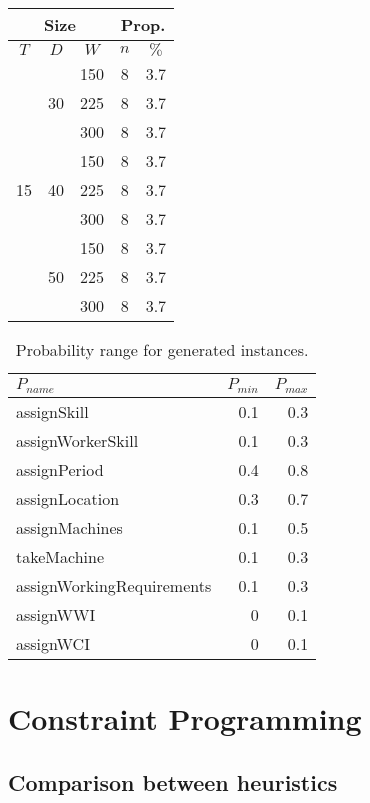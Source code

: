 \documentclass[../../thesis.tex]{subfiles}
\begin{document}
\begin{table}[H]
\begin{tabular}[t]{|c|c|c |c|c|}
    \hline
    \multicolumn{3}{|c|}{Size} & \multicolumn{2}{|c|}{Prop.} \\
    \hline 
    $T$ & $D$ & $W$ & $n$ & $\%$ \\
    \hline 
    \multirow{9}{*}{15} & \multirow{3}{*}{30} & 150 & 8 & 3.7 \\ 
    \cline{3-5}
     &  & 225 & 8 & 3.7 \\ 
     \cline{3-5}
     &  & 300 & 8 & 3.7 \\ 
     \cline{2-5}
     & \multirow{3}{*}{40} & 150 & 8 & 3.7 \\ 
     \cline{3-5}
     &  & 225 & 8 & 3.7 \\ 
     \cline{3-5}
     &  & 300 & 8 & 3.7 \\ 
     \cline{2-5}
     & \multirow{3}{*}{50} & 150 & 8 & 3.7 \\ 
     \cline{3-5}
     &  & 225 & 8 & 3.7 \\ 
     \cline{3-5}
     &  & 300 & 8 & 3.7 \\ 
    \hline
  \end{tabular}
\end{table}


\begin{table}[H]
  \caption{Probability range for generated instances.}
  \label{instances:probabilities}
  \centering
  \begin{tabular}[t]{|l r r|}
    \hline 
    $P_{name}$ & $P_{min}$ & $P_{max}$ \\
    \hline
    assignSkill & 0.1 & 0.3 \\
    assignWorkerSkill & 0.1 & 0.3 \\
    assignPeriod & 0.4 & 0.8 \\
    assignLocation & 0.3 & 0.7 \\
    assignMachines & 0.1 & 0.5 \\
    takeMachine & 0.1 & 0.3 \\
    assignWorkingRequirements & 0.1 & 0.3 \\
    assignWWI & 0 & 0.1 \\
    assignWCI & 0 & 0.1 \\
    \hline
  \end{tabular}
\end{table}

\section{Constraint Programming}

\subsection{Comparison between heuristics}
\label{section:experiments:heuristics}
\end{document}
